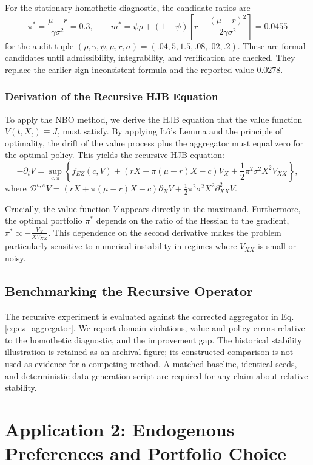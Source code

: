 \documentclass[ecta]{econsocart}
\theoremstyle{plain}
\theoremstyle{remark}
\begin{document}
For the stationary homothetic diagnostic, the candidate ratios are
\[
\pi^*=\frac{\mu-r}{\gamma\sigma^2}=0.3,
\qquad m^*=\psi\rho+(1-\psi)\left[r+\frac{(\mu-r)^2}{2\gamma\sigma^2}\right]=0.0455
\]
for the audit tuple $(\rho,\gamma,\psi,\mu,r,\sigma)=(.04,5,1.5,.08,.02,.2)$. These are formal candidates until admissibility, integrability, and verification are checked. They replace the earlier sign-inconsistent formula and the reported value $0.0278$.

\subsubsection{Derivation of the Recursive HJB Equation}
To apply the NBO method, we derive the HJB equation that the value function $V(t,X_t) \equiv J_t$ must satisfy. By applying It\^o's Lemma and the principle of optimality, the drift of the value process plus the aggregator must equal zero for the optimal policy. This yields the recursive HJB equation:
\begin{equation} \label{eq:ez_hjb_full}
-\partial_t V = \sup_{c,\pi}\left\{f_{EZ}(c,V)+(rX+\pi(\mu-r)X-c)V_X+\frac12\pi^2\sigma^2X^2V_{XX}\right\},
\end{equation}
where $\mathcal{D}^{c,\pi}V = (rX + \pi(\mu-r)X - c)\partial_X V + \frac{1}{2}\pi^2\sigma^2X^2 \partial_{XX}^2 V$.

Crucially, the value function $V$ appears directly in the maximand. Furthermore, the optimal portfolio $\pi^*$ depends on the ratio of the Hessian to the gradient, $\pi^* \propto -\frac{V_X}{X V_{XX}}$. This dependence on the second derivative makes the problem particularly sensitive to numerical instability in regimes where $V_{XX}$ is small or noisy.

\subsection{Benchmarking the Recursive Operator}
The recursive experiment is evaluated against the corrected aggregator in Eq. \eqref{eq:ez_aggregator}. We report domain violations, value and policy errors relative to the homothetic diagnostic, and the improvement gap. The historical stability illustration is retained as an archival figure; its constructed comparison is not used as evidence for a competing method. A matched baseline, identical seeds, and deterministic data-generation script are required for any claim about relative stability.

\section{Application 2: Endogenous Preferences and Portfolio Choice}
\label{sec:application_ndu}
\end{document}
